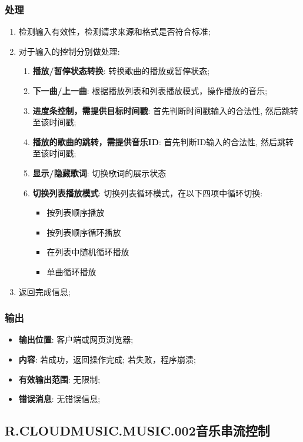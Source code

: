 \subsubsection{处理}
	\begin{enumerate}
		\item 检测输入有效性，检测请求来源和格式是否符合标准;
		\item 对于输入的控制分别做处理: 
		\begin{enumerate}
			\item \textbf{播放/暂停状态转换}: 
				转换歌曲的播放或暂停状态;
			\item \textbf{下一曲/上一曲}: 
				根据播放列表和列表播放模式，操作播放的音乐;
			\item \textbf{进度条控制，需提供目标时间戳}: 
				首先判断时间戳输入的合法性,
				然后跳转至该时间戳;
			\item \textbf{播放的歌曲的跳转，需提供音乐ID}: 
				首先判断ID输入的合法性,
				然后跳转至该时间戳;
			\item \textbf{显示/隐藏歌词}: 
				切换歌词的展示状态
			\item \textbf{切换列表播放模式}: 
				切换列表循环模式，在以下四项中循环切换: 
					\begin{itemize}
						\item 按列表顺序播放
						\item 按列表顺序循环播放
						\item 在列表中随机循环播放
						\item 单曲循环播放
					\end{itemize}
		\end{enumerate}
		\item 返回完成信息;
	\end{enumerate}
\subsubsection{输出}
\begin{itemize}
	\item \textbf{输出位置}: 客户端或网页浏览器;
	\item \textbf{内容}: 若成功，返回操作完成; 若失败，程序崩溃;
	\item \textbf{有效输出范围}: 无限制;
	\item \textbf{错误消息}: 无错误信息;
\end{itemize}

\subsection{R.CLOUDMUSIC.MUSIC.002音乐串流控制}
